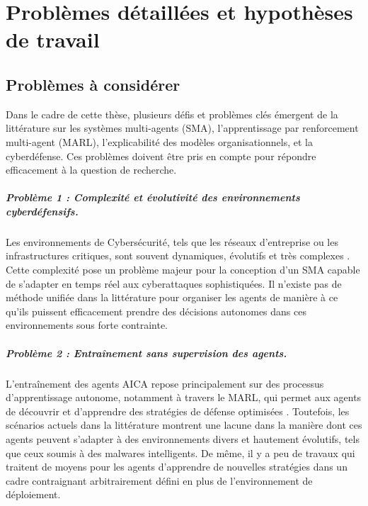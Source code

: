 \chapter{Problèmes détaillées et hypothèses de travail}\label{ch:problem}


\section{Problèmes à considérer}

Dans le cadre de cette thèse, plusieurs défis et problèmes clés émergent de la littérature sur les systèmes multi-agents (SMA), l'apprentissage par renforcement multi-agent (MARL), l'explicabilité des modèles organisationnels, et la cyberdéfense. Ces problèmes doivent être pris en compte pour répondre efficacement à la question de recherche.

\paragraph{Problème 1 : Complexité et évolutivité des environnements cyberdéfensifs.}
Les environnements de Cybersécurité, tels que les réseaux d'entreprise ou les infrastructures critiques, sont souvent dynamiques, évolutifs et très complexes \cite{Calo2017, Kott2019}. Cette complexité pose un problème majeur pour la conception d'un SMA capable de s'adapter en temps réel aux cyberattaques sophistiquées. Il n'existe pas de méthode unifiée dans la littérature pour organiser les agents de manière à ce qu'ils puissent efficacement prendre des décisions autonomes dans ces environnements sous forte contrainte.

\paragraph{Problème 2 : Entraînement sans supervision des agents.}
L'entraînement des agents AICA repose principalement sur des processus d'apprentissage autonome, notamment à travers le MARL, qui permet aux agents de découvrir et d'apprendre des stratégies de défense optimisées \cite{Jamont2015, Theron2020}. Toutefois, les scénarios actuels dans la littérature montrent une lacune dans la manière dont ces agents peuvent s'adapter à des environnements divers et hautement évolutifs, tels que ceux soumis à des malwares intelligents. De même, il y a peu de travaux qui traitent de moyens pour les agents d'apprendre de nouvelles stratégies dans un cadre contraignant arbitrairement défini en plus de l'environnement de déploiement.


